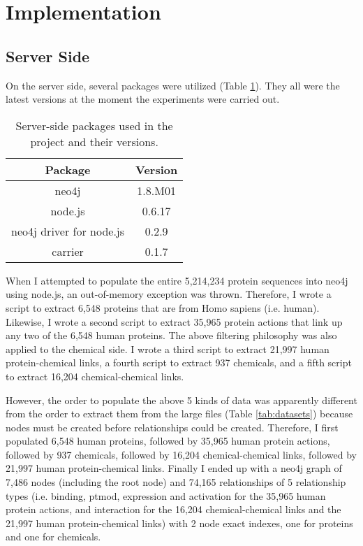 \documentclass[10pt,conference,compsocconf]{../IEEEtran}
\begin{document}
\section{Implementation}

\subsection{Server Side}

On the server side, several packages were utilized (Table \ref{tab:serverpackages}). They all were the latest versions at the moment the experiments were carried out.

\begin{table}
\centering
\begin{tabular*}
{\linewidth}
{@{\extracolsep{\fill}}cc}
\toprule
Package & Version\\
\midrule
neo4j & 1.8.M01\\
node.js & 0.6.17\\
neo4j driver for node.js & 0.2.9\\
carrier & 0.1.7\\
\bottomrule
\end{tabular*}
\caption{Server-side packages used in the project and their versions.}
\label{tab:serverpackages}
\end{table}

When I attempted to populate the entire 5,214,234 protein sequences into neo4j using node.js, an out-of-memory exception was thrown. Therefore, I wrote a script to extract 6,548 proteins that are from Homo sapiens (i.e. human). Likewise, I wrote a second script to extract 35,965 protein actions that link up any two of the 6,548 human proteins. The above filtering philosophy was also applied to the chemical side. I wrote a third script to extract 21,997 human protein-chemical links, a fourth script to extract 937 chemicals, and a fifth script to extract 16,204 chemical-chemical links.

However, the order to populate the above 5 kinds of data was apparently different from the order to extract them from the large files (Table \ref{tab:datasets}) because nodes must be created before relationships could be created. Therefore, I first populated 6,548 human proteins, followed by 35,965 human protein actions, followed by 937 chemicals, followed by 16,204 chemical-chemical links, followed by 21,997 human protein-chemical links. Finally I ended up with a neo4j graph of 7,486 nodes (including the root node) and 74,165 relationships of 5 relationship types (i.e. binding, ptmod, expression and activation for the 35,965 human protein actions, and interaction for the 16,204 chemical-chemical links and the 21,997 human protein-chemical links) with 2 node exact indexes, one for proteins and one for chemicals.
\end{document}
